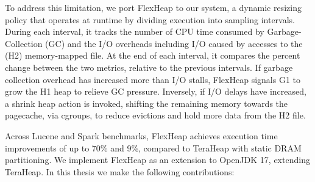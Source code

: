 %
%
%

To address this limitation, we port FlexHeap \cite{flexheap} to our system, a dynamic
resizing policy that operates at runtime by dividing execution into sampling
intervals. During each interval, it tracks the number of CPU time consumed by Garbage-Collection (GC)
and the I/O overheads including I/O caused by accesses to
the (H2) memory-mapped file. At the end of each interval, it compares the
percent change between the two metrics, relative to the previous intervals. If
garbage collection overhead has increased more than I/O stalls, FlexHeap
signals G1 to grow the H1 heap to relieve GC pressure. Inversely, if I/O delays
have increased, a shrink heap action is invoked, shifting the remaining memory
towards the pagecache, via cgroups, to reduce evictions and hold more data from
the H2 file.

Across Lucene and Spark benchmarks, FlexHeap achieves 
execution time improvements of up to 70\% and 9\%, compared to 
TeraHeap with static DRAM partitioning. We implement FlexHeap as an extension 
to OpenJDK 17, extending TeraHeap.
In this thesis we make the following contributions:

